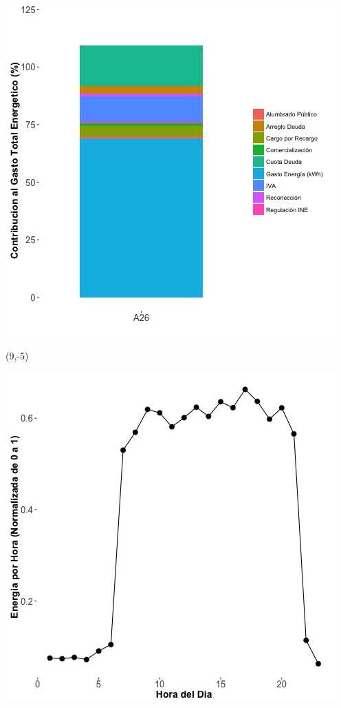 \documentclass{article}\usepackage[]{graphicx}\usepackage[]{color}
\newenvironment{knitrout}{}{} %
\begin{document}
\begin{knitrout}
\color{fgcolor}
\includegraphics[scale=0.65]{figure/A26_costvars_plot.jpg} 
\end{knitrout}

 \begin{textblock}{1}(9,-5)
\begin{minipage}{20em}
\begingroup

\endgroup
\end{minipage}
\end{textblock}

\begin{knitrout}
\color{fgcolor}
\includegraphics[scale=0.65]{figure/A26_plot_norm_median} 
\end{knitrout}
\end{document}
